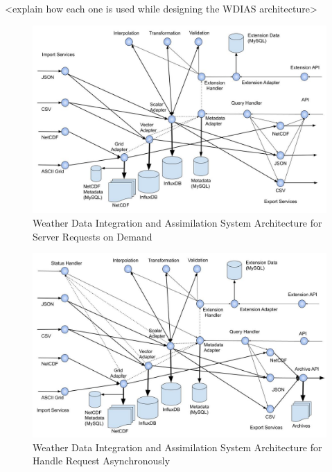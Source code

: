<explain how each one is used while designing the WDIAS architecture>

\begin{figure}[htp]
    \centering
    \includegraphics[width=1\textwidth]{method/microservice/microservice_architecture-handle_on_demand-v3.jpg}
    \caption{Weather Data Integration and Assimilation System Architecture for Server Requests on Demand}
    \label{fi:wdias_micro_on_demand}
\end{figure}

\begin{figure}[htp]
    \centering
    \includegraphics[width=1\textwidth]{method/microservice/microservice_architecture-handle_on_async-v3.jpg}
    \caption{Weather Data Integration and Assimilation System Architecture for Handle Request Asynchronously}
    \label{fi:wdias_micro_async}
\end{figure}

